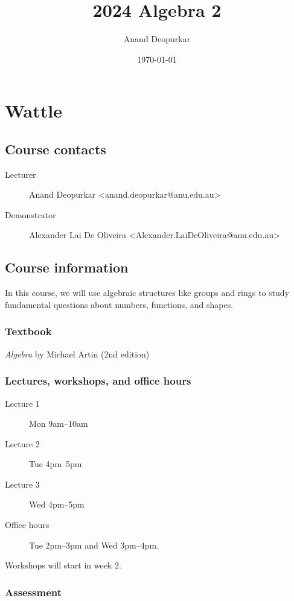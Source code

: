 \documentclass[11pt]{article}
\author{Anand Deopurkar}
\date{\today}
\title{2024 Algebra 2}
\begin{document}
\maketitle
\section{Wattle}
\label{sec:orgb12b731}
\subsection{Course contacts}
\label{sec:org21cbdbd}

\begin{description}
\item[{Lecturer}] Anand Deopurkar <anand.deopurkar@anu.edu.au>
\item[{Demonstrator}] Alexander Lai De Oliveira <Alexander.LaiDeOliveira@anu.edu.au>
\end{description}
\subsection{Course information}
\label{sec:org91d48d2}

In this course, we will use algebraic structures like groups and rings to study fundamental questions about numbers, functions, and shapes.
\subsubsection{Textbook}
\label{sec:org00067cd}

\emph{Algebra} by Michael Artin (2nd edition)
\subsubsection{Lectures, workshops, and office hours}
\label{sec:org9dc221d}

\begin{description}
\item[{Lecture 1}] Mon 9am--10am
\item[{Lecture 2}] Tue 4pm--5pm
\item[{Lecture 3}] Wed 4pm--5pm

\item[{Office hours}] Tue 2pm--3pm and Wed 3pm--4pm.
\end{description}

Workshops will start in week 2.
\subsubsection{Assessment}
\label{sec:orgab5799c}
\end{document}
